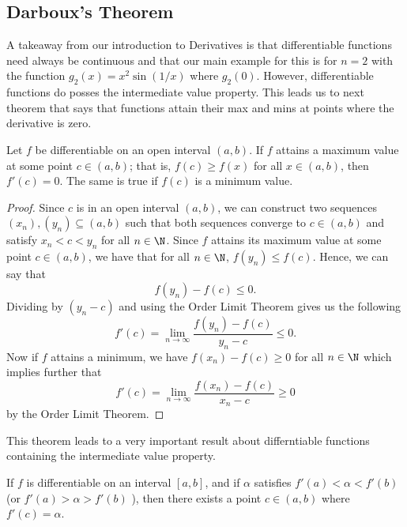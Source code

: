 \subsection{Darboux's Theorem}

A takeaway from our introduction to Derivatives is that differentiable functions need always be continuous and that our main example for this is for \( n = 2  \) with the function \( g_2(x) = x^2 \sin( 1 / x) \) where \( g_2(0)  \). However, differentiable functions do posses the intermediate value property. This leads us to next theorem that says that functions attain their max and mins at points where the derivative is zero. 

\begin{tcolorbox}
    \begin{thm} Let \( f  \) be differentiable on an open interval \( (a,b)  \). If \( f  \) attains a maximum value at some point \( c \in (a,b)  \); that is, \( f(c) \geq f(x)  \) for all \( x \in (a,b)  \), then \( f'(c) = 0  \). The same is true if \( f(c)  \) is a minimum value.

\end{thm}
\end{tcolorbox}

\begin{proof}
    Since \( c  \) is in an open interval \( (a,b) \), we can construct two sequences \( (x_n), (y_n) \subseteq (a,b)  \) such that both sequences converge to \( c \in (a,b)  \) and satisfy \( x_n < c < y_n  \) for all \( n \in \N  \). Since \( f  \) attains its maximum value at some point \( c \in (a,b)  \), we have that for all \( n \in \N  \), \( f(y_n) \leq f(c)  \). Hence, we can say that 
    \[  f(y_n) - f(c) \leq 0. \]
    Dividing by \( (y_n - c ) \) and using the Order Limit Theorem gives us the following
    \[  f'(c) = \lim_{ n \to \infty   } \frac{ f(y_n) - f(c)  }{ y_n - c  } \leq 0 \tag{1}. \]
    Now if \( f  \) attains a minimum, we have \( f(x_n) - f(c) \geq 0  \) for all \( n \in \N  \) which implies further that 
    \[  f'(c) = \lim_{ n \to \infty  } \frac{ f(x_n) - f(c)  }{ x_n - c  } \geq 0 \]
    by the Order Limit Theorem.
\end{proof}

This theorem leads to a very important result about differntiable functions containing the intermediate value property.

\begin{tcolorbox}
    \begin{thm}
    If \( f  \) is differentiable on an interval \( [a,b]  \), and if \( \alpha  \) satisfies \( f'(a) < \alpha < f'(b)  \) (or \( f'(a) > \alpha > f'(b)  \) ), then there exists a point \( c \in (a,b)  \) where \( f'(c) = \alpha \).
    \end{thm}
\end{tcolorbox}

